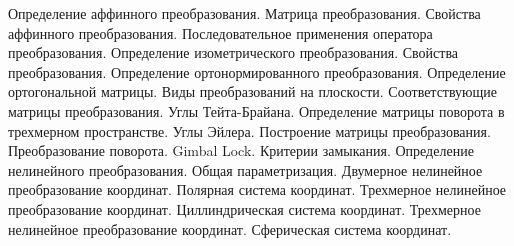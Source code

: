 Определение аффинного преобразования. Матрица преобразования.
Свойства аффинного преобразования. Последовательное применения оператора преобразования.
Определение изометрического преобразования. Свойства преобразования.
Определение ортонормированного преобразования. Определение ортогональной матрицы.
Виды преобразований на плоскости. Соответствующие матрицы преобразования.
Углы Тейта-Брайана. Определение матрицы поворота в трехмерном пространстве.
Углы Эйлера. Построение матрицы преобразования.
Преобразование поворота. Gimbal Lock. Критерии замыкания.
Определение нелинейного преобразования. Общая параметризация.
Двумерное нелинейное преобразование координат. Полярная система координат.
Трехмерное нелинейное преобразование координат. Циллиндрическая система координат.
Трехмерное нелинейное преобразование координат. Сферическая система координат.
